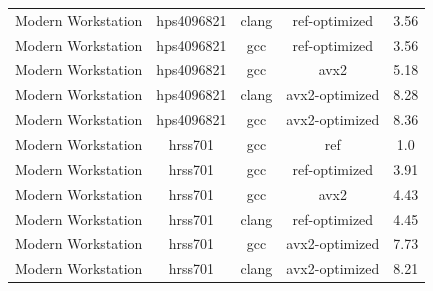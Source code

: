 \begin{table}
\begin{tabularx}{\linewidth}{X c c c c}
          Modern Workstation &           hps4096821 &                clang &        ref-optimized &                3.56\\
          Modern Workstation &           hps4096821 &                  gcc &        ref-optimized &                3.56\\
          Modern Workstation &           hps4096821 &                  gcc &                 avx2 &                5.18\\
          Modern Workstation &           hps4096821 &                clang &       avx2-optimized &                8.28\\
          Modern Workstation &           hps4096821 &                  gcc &       avx2-optimized &                8.36\\
          Modern Workstation &              hrss701 &                  gcc &                  ref &                  1.0\\
          Modern Workstation &              hrss701 &                  gcc &        ref-optimized &                3.91\\
          Modern Workstation &              hrss701 &                  gcc &                 avx2 &                4.43\\
          Modern Workstation &              hrss701 &                clang &        ref-optimized &                4.45\\
          Modern Workstation &              hrss701 &                  gcc &       avx2-optimized &                7.73\\
          Modern Workstation &              hrss701 &                clang &       avx2-optimized &                8.21\\
        \bottomrule
    \end{tabularx}
\end{table}

